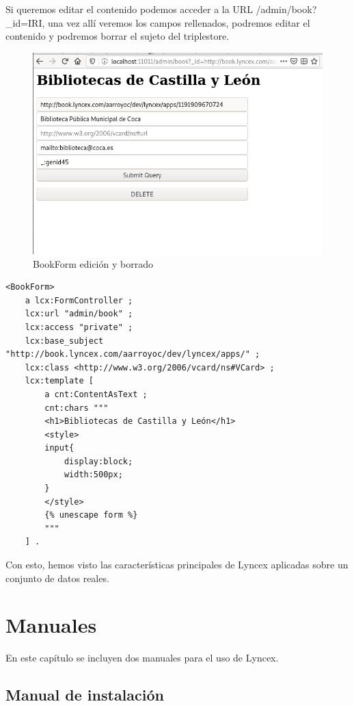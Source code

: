 \documentclass[12pt]{report} %
\begin{document}
Si queremos editar el contenido podemos acceder a la URL /admin/book?\_id=IRI, una vez allí veremos los campos rellenados, podremos editar el contenido y podremos borrar el sujeto del triplestore.

\begin{figure}
    \centering
    \includegraphics[width=\textwidth]{tour/bibliocyl7.png}
    \caption{BookForm edición y borrado}
    \label{fig:bibliocyl7}
\end{figure}

\begin{lstlisting}
<BookForm>
    a lcx:FormController ;
    lcx:url "admin/book" ;
    lcx:access "private" ;
    lcx:base_subject "http://book.lyncex.com/aarroyoc/dev/lyncex/apps/" ;
    lcx:class <http://www.w3.org/2006/vcard/ns#VCard> ;
    lcx:template [
        a cnt:ContentAsText ;
        cnt:chars """
        <h1>Bibliotecas de Castilla y León</h1>
        <style>
        input{
            display:block;
            width:500px;
        }
        </style>
        {% unescape form %}
        """
    ] .
\end{lstlisting}

Con esto, hemos visto las características principales de Lyncex aplicadas sobre un conjunto de datos reales.


\chapter{Manuales}

En este capítulo se incluyen dos manuales para el uso de Lyncex.

\section{Manual de instalación}
\end{document}
